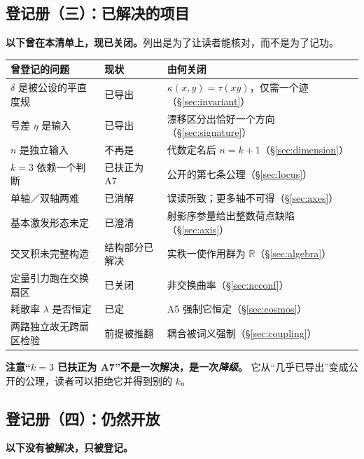 \documentclass[11pt,a4paper]{article}
\theoremstyle{sudef}
\newcommand{\kron}{\delta}
\begin{document}
\subsection{登记册（三）：已解决的项目}\label{ss:closed}

\textbf{以下曾在本清单上，现已关闭。}列出是为了让读者能核对，而不是为了记功。

\begin{center}
\small
\begin{tabular}{lll}
\toprule
曾登记的问题 & 现状 & 由何关闭 \\
\midrule
$\kron$ 是被公设的平直度规 & 已导出 & $\kappa(x,y)=\tau(xy)$，仅需一个迹（\S\ref{sec:invariant}）\\
号差 $\eta$ 是输入 & 已导出 & 漂移区分出恰好一个方向（\S\ref{sec:signature}）\\
$n$ 是独立输入 & 不再是 & 代数定名后 $n=k+1$（\S\ref{sec:dimension}）\\
$k=3$ 依赖一个判断 & 已扶正为 A7 & 公开的第七条公理（\S\ref{sec:locus}）\\
单轴／双轴两难 & 已消解 & 误读所致；更多轴不可得（\S\ref{sec:axes}）\\
基本激发形态未定 & 已澄清 & 射影序参量给出整数荷点缺陷（\S\ref{sec:axis}）\\
交叉积未完整构造 & 结构部分已解决 & 实秩一使作用群为 $\mathbb R$（\S\ref{sec:algebra}）\\
定量引力跑在交换扇区 & 已关闭 & 非交换曲率（\S\ref{sec:ncconf}）\\
耗散率 $\lambda$ 是否恒定 & 已定 & A5 强制它恒定（\S\ref{sec:cosmos}）\\
两路独立故无跨扇区检验 & 前提被推翻 & 耦合被词义强制（\S\ref{sec:coupling}）\\
\bottomrule
\end{tabular}
\end{center}

\textbf{注意“$k=3$ 已扶正为 A7”不是一次解决，是一次\emph{降级}。}
它从“几乎已导出”变成公开的公理，读者可以拒绝它并得到别的 $k$。

\subsection{登记册（四）：仍然开放}\label{ss:open}

\textbf{以下没有被解决，只被登记。}
\end{document}
